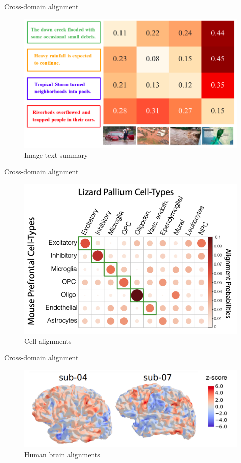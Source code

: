 \documentclass{beamer}
\begin{document}
\begin{frame}{Cross-domain alignment}
  \begin{figure}
    \centering
    \includegraphics[width=0.7\linewidth, keepaspectratio=true]{OT_new/img2text.png}
    \caption*{\scriptsize{Image-text summary \parencite{Qiu23}}}
  \end{figure}
\end{frame}

\begin{frame}{Cross-domain alignment}
  \begin{figure}
    \centering
    \includegraphics[width=0.7\linewidth, keepaspectratio=true]{OT_new/xSp_cellAlign.png}
    \caption*{\scriptsize{Cell alignments \parencite{Demetci23}}}
  \end{figure}
\end{frame}

\begin{frame}{Cross-domain alignment}
  \begin{figure}
    \centering
    \includegraphics[width=0.7\linewidth, keepaspectratio=true]{OT_new/intro_brain.pdf}
    \caption*{\scriptsize{Human brain alignments \parencite{Thual22}}}
  \end{figure}
\end{frame}
\end{document}
